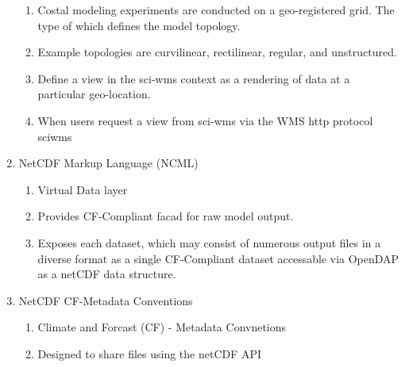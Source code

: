 \documentclass{article}
\begin{document}
\begin{enumerate}
\begin{enumerate}[label*=\arabic*.]
        \item Costal modeling experiments are conducted on a
          geo-registered grid. The type of which defines the model
          topology.
        \item Example topologies are curvilinear, rectilinear, regular, and unstructured.
        \item Define a view in the sci-wms context as a rendering of data at a particular geo-location.
        \item When users request a view from sci-wms via the WMS http protocol sciwms
      \end{enumerate}
    \item NetCDF Markup Language (NCML)
      \begin{enumerate}[label*=\arabic*.]
        \item Virtual Data layer
        \item Provides CF-Compliant facad for raw model output.
        \item Exposes each dataset, which may consist of numerous
          output files in a diverse format as a single CF-Compliant
          dataset accessable via OpenDAP as a netCDF data structure.
      \end{enumerate}

    \item NetCDF CF-Metadata Conventions
      \begin{enumerate}[label*=\arabic*.]
        \item Climate and Forcast (CF) - Metadata Convnetions
        \item Designed to share files using the netCDF API
      \end{enumerate}
\end{enumerate}

\nocite{pyugrid}
\nocite{wms14}


\end{document}
